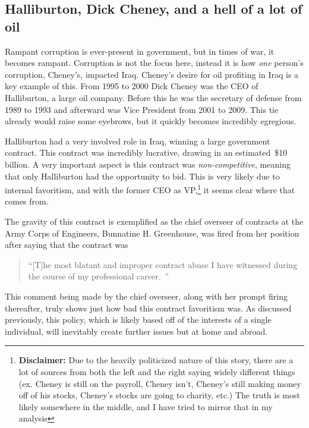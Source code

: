 \documentclass[12pt]{article}
\begin{document}
    \subsection{Halliburton, Dick Cheney, and a hell of a lot of oil}
        Rampant corruption is ever-present in government, but in times of war, it becomes rampant. Corruption is not the focus here, instead it is how \textit{one} person's corruption, Cheney's, impacted Iraq. Cheney's desire for oil profiting in Iraq is a key example of this. From 1995 to 2000 Dick Cheney was the CEO of Halliburton, a large oil company. Before this he was the secretary of defense from 1989 to 1993 and afterward was Vice President from 2001 to 2009. This tie already would raise some eyebrows, but it quickly becomes incredibly egregious. 
        
        Halliburton had a very involved role in Iraq, winning a large government contract. This contract was incredibly lucrative, drawing in an estimated~\$10 billion. A very important aspect is this contract was \textit{non-competitive}, meaning that only Halliburton had the opportunity to bid. \parencite{bbc2008iraqcontracts} This is very likely due to internal favoritism, and with the former CEO as VP,\footnote{\textbf{Disclaimer:} Due to the heavily politicized nature of this story, there are a lot of sources from both the left and the right saying widely different things (ex. Cheney is still on the payroll, Cheney isn't, Cheney's still making money off of his stocks, Cheney's stocks are going to charity, etc.) The truth is most likely somewhere in the middle, and I have tried to mirror that in my analysis}
        it seems clear where that comes from. 
        
        The gravity of this contract is exemplified as the chief overseer of contracts at the Army Corps of Engineers, Bunnatine H. Greenhouse, was fired from her position after saying that the contract was 

        \begin{quote}
            ``[T]he most blatant and improper contract abuse I have witnessed during the course of my professional career.~\parencite{nytimes2005halliburtoncontract}''
        \end{quote}  

        This comment being made by the chief overseer, along with her prompt firing thereafter, truly shows just how bad this contract favoritism was. As discussed previously, this policy, which is likely based off of the interests of a single individual, will inevitably create further issues but at home and abroad.  
        
\end{document}
